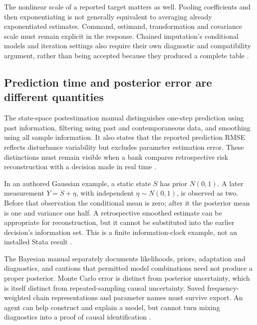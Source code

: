 The nonlinear scale of a reported target matters as well. Pooling
coefficients and then exponentiating is not generally equivalent to
averaging already exponentiated estimates. Command, estimand, transformation
and covariance scale must remain explicit in the response. Chained
imputation's conditional models and iteration settings also require their
own diagnostic and compatibility argument, rather than being accepted
because they produced a complete table
\citep{exec21_transport_stata_estimate,exec21_transport_stata_chained,
exec24_stata_choice}.

\subsection{Prediction time and posterior error are different quantities}
The state-space postestimation manual distinguishes one-step prediction
using past information, filtering using past and contemporaneous data, and
smoothing using all sample information. It also states that the reported
prediction RMSE reflects disturbance variability but excludes parameter
estimation error. These distinctions must remain visible when a bank
compares retrospective risk reconstruction with a decision made in real
time \citep{exec22_state_stata_sspace_post}.

In an authored Gaussian example, a static state $S$ has prior $N(0,1)$.
A later measurement $Y=S+\eta$, with independent $\eta\sim N(0,1)$, is
observed as two. Before that observation the conditional mean is zero;
after it the posterior mean is one and variance one half. A retrospective
smoothed estimate can be appropriate for reconstruction, but it cannot
be substituted into the earlier decision's information set. This is a
finite information-clock example, not an installed Stata result
\citep{exec24_stata_choice}.

The Bayesian manual separately documents likelihoods, priors, adaptation
and diagnostics, and cautions that permitted model combinations need not
produce a proper posterior. Monte Carlo error is distinct from posterior
uncertainty, which is itself distinct from repeated-sampling causal
uncertainty. Saved frequency-weighted chain representations and parameter
names must survive export. An agent can help construct and explain a model,
but cannot turn mixing diagnostics into a proof of causal identification
\citep{exec22_state_stata_bayesmh,exec24_stata_choice}.

